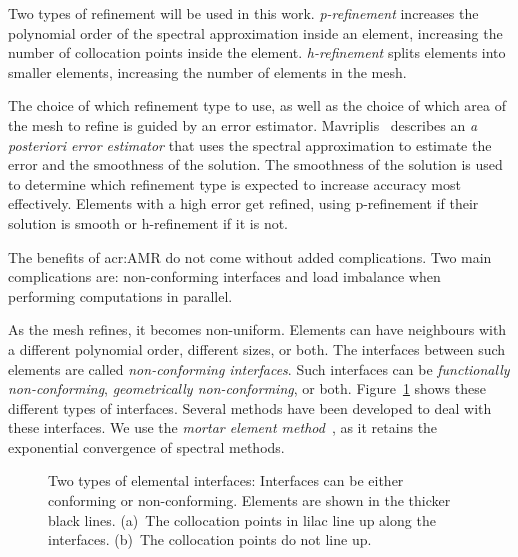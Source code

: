 Two types of refinement will be used in this work. \textit{p-refinement} increases the polynomial
order of the spectral approximation inside an element, increasing the number of collocation points
inside the element. \textit{h-refinement} splits elements into smaller elements, increasing the
number of elements in the mesh.

The choice of which refinement type to use, as well as the choice of which area of the mesh to
refine is guided by an error estimator. Mavriplis~\cite{Mavriplis1990} describes an \textit{a
posteriori error estimator} that uses the spectral approximation to estimate the error and the
smoothness of the solution. The smoothness of the solution is used to determine which refinement
type is expected to increase accuracy most effectively. Elements with a high error get refined, using
p-refinement if their solution is smooth or h-refinement if it is not.

The benefits of \acrshort{acr:AMR} do not come without added complications. Two main complications
are: non-conforming interfaces and load imbalance when performing computations in parallel.

As the mesh refines, it becomes non-uniform. Elements can have neighbours with a different
polynomial order, different sizes, or both. The interfaces between such elements are called
\textit{non-conforming interfaces}. Such interfaces can be \textit{functionally non-conforming},
\textit{geometrically non-conforming}, or both. Figure~\ref{fig:intro_interfaces} shows these
different types of interfaces. Several methods have been developed to deal with these interfaces. We
use the \textit{mortar element method}~\cite{Maday1989}, as it retains the exponential convergence
of spectral methods.

\begin{figure}[H]
    \centering
    \hfill
    \caption{Two types of elemental interfaces: Interfaces can be either conforming or
        non-conforming. Elements are shown in the thicker black lines. (a)~The collocation points in
        lilac line up along the interfaces. (b)~The collocation points do not line
        up.}\label{fig:intro_interfaces}
\end{figure}

